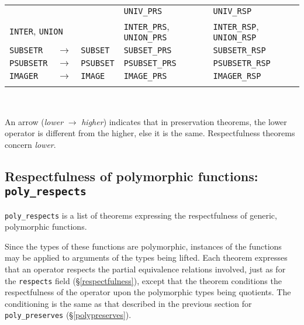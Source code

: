 \documentclass[envcountsame,runningheads]{llncs}
\newcommand{\quotient}{partial equivalence}
\begin{document}
\begin{table}
\begin{center}
\begin{tabular}{|lll|l|l|}
\begin{comment}
{\tt UNIV} & & & {\tt UNIV\_PRS} & {\tt UNIV\_RSP} \\
\multicolumn{3}{|l|}{{\tt INTER}, {\tt UNION}}
  & {\tt INTER\_PRS}, {\tt UNION\_PRS} & {\tt INTER\_RSP}, {\tt UNION\_RSP} \\
{\tt SUBSETR} & $\rightarrow$ & {\tt SUBSET}
& {\tt SUBSET\_PRS} & {\tt SUBSETR\_RSP} \\
{\tt PSUBSETR} & $\rightarrow$ & {\tt PSUBSET}
& {\tt PSUBSET\_PRS} & {\tt PSUBSETR\_RSP} \\
{\tt IMAGER} & $\rightarrow$ & {\tt IMAGE}
& {\tt IMAGE\_PRS} & {\tt IMAGER\_RSP} \\
\end{comment}
\\
\hline
\end{tabular}
\\
\end{center}
An arrow
({\it lower} $\rightarrow$ {\it higher})
indicates that in 
preservation theorems,
the lower operator
is different
from the higher,
else
it
is the same.
Respectfulness theorems concern
{\it lower}.
\end{table}

%
\subsection{Respectfulness of polymorphic functions: {\tt poly\_respects}}
%
\label{polyrespects}

{\tt poly\_respects} is a list of theorems expressing the
respectfulness of generic, polymorphic functions.

Since the types of
these functions are polymorphic, instances of the functions may be applied 
to arguments of the types being lifted.
Each theorem expresses
that an operator respects the \quotient{} relations involved, just as
for the {\tt respects} field (\S\ref{respectfulness}),
except that the theorem conditions
the respectfulness of the operator upon the polymorphic types being
quotients.  The conditioning is the same as that described
in the previous section
for {\tt poly\_preserves} (\S\ref{polypreserves}).
\end{document}

